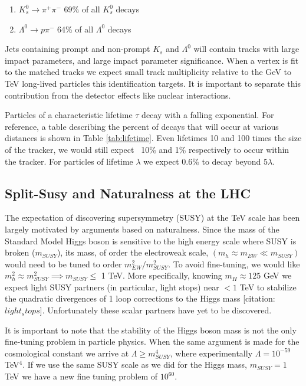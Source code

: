 \begin{enumerate}
\item $K_s^0 \rightarrow \pi^+\pi^-$ 69\% of all $K_s^0$ decays 
\item $\Lambda^0 \rightarrow p \pi^-$ 64\% of all $\Lambda^0$ decays 
\end{enumerate}

Jets containing prompt and non-prompt $K_s$ and $\Lambda^0$ will contain tracks with large impact parameters, 
and large impact parameter significance. When a vertex is fit to the matched tracks we expect small track multiplicity relative 
to the GeV to TeV   long-lived particles this identification targets. It is important to separate this contribution from
the detector effects like nuclear interactions.




Particles of a characteristic lifetime $\tau$ decay with a falling exponential. For reference, 
a table describing the percent of decays that will occur at various distances is shown in Table
 \ref{tab:lifetime}. Even lifetimes 10 and 100 times the size of the tracker, we would still expect
~10\% and 1\% respectively to occur within the tracker. For particles  of lifetime $\lambda$ we
expect 0.6\% to decay beyond $5\lambda$. 



\subsection{Split-Susy and Naturalness at the LHC}

The expectation of discovering supersymmetry (SUSY) at the TeV scale has been largely motivated
 by arguments based on naturalness. 
Since the mass of the Standard Model Higgs boson is sensitive to the high energy scale where SUSY
 is broken ($m_{SUSY}$), its mass, of order the electroweak scale, $(m_h \approx m_{EW} \ll m_{SUSY})$
 would need to be tuned to order $m_{EW}^2/m_{SUSY}^2$. 
To avoid fine-tuning, we would like  $m_h^2 \approx m_{SUSY}^2 \implies m_{SUSY} \leq$ 1 TeV. 
More specifically, knowing $m_H \approx 125$ GeV we expect light SUSY partners (in particular, light stops)
 near $< 1$ TeV to stabilize the quadratic divergences of 1 loop corrections to the Higgs mass
 [citation:$light_stops$]. 
Unfortunately these scalar partners have yet to be discovered.

It is important to note that the stability of the Higgs boson mass is not the only
 fine-tuning problem in particle physics. 
When the same argument is made for the cosmological constant we arrive at $\Lambda \geq m_{SUSY}^4$, 
where experimentally $\Lambda = 10^{-59}$ TeV$^4$.   
If we use the same SUSY scale as we did for the Higgs mass,
 $m_{SUSY} = 1$ TeV we have a new fine tuning problem of $10^{60}$.

